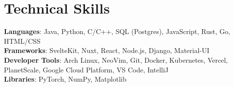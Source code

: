 \documentclass[letterpaper,11pt]{article}
\begin{document}
%
\section{Technical Skills}
 \begin{itemize}[leftmargin=0.15in, label={}]
    \small{\item{
     \textbf{Languages}{: Java, Python, C/C++, SQL (Postgres), JavaScript, Rust, Go, HTML/CSS} \\
     \textbf{Frameworks}{: SvelteKit, Nuxt, React, Node.js, Django, Material-UI} \\
     \textbf{Developer Tools}{: Arch Linux, NeoVim, Git, Docker, Kubernetes, Vercel, PlanetScale, Google Cloud Platform, VS Code, IntelliJ} \\
     \textbf{Libraries}{: PyTorch, NumPy, Matplotlib}
    }}
 \end{itemize}


\end{document}

